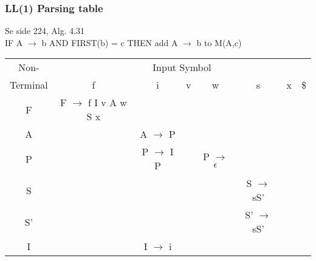 \documentclass{article}
\begin{document}
\subsubsection*{LL(1) Parsing table}
Se side 224, Alg. 4.31\\
IF A $\rightarrow$ b AND FIRST(b) = c THEN add A $\rightarrow$ b to
M(A,c)\\
\begin{tabular}{|c|c|c|c|c|c|c|c|}
\hline
Non- & \multicolumn{7}{c|}{Input Symbol}\\
\cline{2-8}
Terminal & f & i & v & w & s & x & \$ \\
\hline
\hline
F  & F $\rightarrow$ f I v A w S x & & & & & & \\
\hline
A  & & A $\rightarrow$ P & & & & & \\
\hline
P  & & P $\rightarrow$ I P & & P $\rightarrow$ $\epsilon$ & & & \\
\hline
S  & & & & & S $\rightarrow$ sS' & & \\
\hline
S' & & & & & S' $\rightarrow$ sS' & & \\
\hline
I  & & I $\rightarrow$ i & & & & & \\
\hline
\end{tabular}


\printindex
\end{document}
